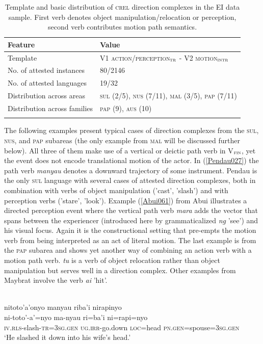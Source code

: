 \begin{table}
\begin{tabular}{ll}
\lsptoprule
Feature&Value\tabularnewline
\hline
Template&V1 \textsc{action/perception$_{\textsc{tr}}$} - V2 \textsc{motion$_\textsc{intr}$}\tabularnewline
No. of attested instances& 80/2146 \tabularnewline
No. of attested languages& 19/32 \tabularnewline
Distribution across areas& \textsc{sul} (2/5), \textsc{nus} (7/11), \textsc{mal} (3/5), \textsc{pap} (7/11) \tabularnewline
Distribution across families& \textsc{pap} (9), \textsc{aus} (10) \tabularnewline
\lspbottomrule
\end{tabular}
\caption[Template and basic distribution of \textsc{crel} direction complexes]{Template and basic distribution of \textsc{crel} direction complexes in the EI data sample. First verb denotes object manipulation/relocation or perception, second verb contributes motion path semantics.}
\label{table:basiccreldir}
\end{table}


The following examples present typical cases of direction complexes from the \textsc{sul}, \textsc{nus}, and \textsc{pap} subareas (the only example from \textsc{mal} will be discussed further below). All three of them make use of a vertical or deictic path verb in V$_{\textsc{fin}}$, yet the event does not encode translational motion of the actor. In (\ref{Pendau027}) the path verb \textit{manyau} denotes a downward trajectory of some instrument. Pendau is the only \textsc{sul} language with several cases of attested direction complexes, both in combination with verbs of object manipulation ('cast', 'slash') and with perception verbs ('stare', 'look'). Example (\ref{Abui061}) from Abui illustrates a directed perception event where the vertical path verb \textit{mara} adds the vector that spans between the experiencer (introduced here by grammaticalized \textit{ng} 'see') and his visual focus. Again it is the constructional setting that pre-empts the motion verb from being interpreted as an act of literal motion. The last example is from the \textsc{pap} subarea and shows yet another way of combining an action verb with a motion path verb. \textit{tu} is a verb of object relocation rather than object manipulation but serves well in a direction complex. Other examples from Maybrat involve the verb \textit{ai} 'hit'.

\ea \label{Pendau027}
\\
\glll nitoto'a'onyo manyau riba'i nirapinyo \\
ni-toto'-a'=nyo ma-nyau ri=ba'i ni=rapi=nyo \\
\textsc{iv}.\textsc{rls}-slash-\textsc{tr}=\textsc{3}\textsc{sg}.\textsc{gen} \textsc{ug}.\textsc{irr}-go.down \textsc{loc}=head \textsc{pn}.\textsc{gen}=spouse=\textsc{3}\textsc{sg}.\textsc{gen} \\
\glft `He slashed it down into his wife's head.' \\ 
\z

